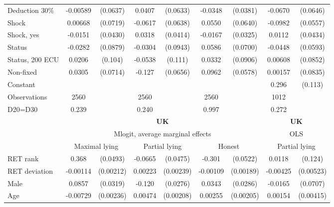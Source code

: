 \begin{tabular}{l|cccccc|cc}
Deduction 30\%& -0.00589         & (0.0637)&   0.0407         & (0.0633)&  -0.0348         & (0.0381)&  -0.0670         & (0.0646)\\
Shock         &  0.00668         & (0.0719)&  -0.0617         & (0.0638)&   0.0550         & (0.0640)&  -0.0982\sym{*}  & (0.0557)\\
Shock, yes    &  -0.0151         & (0.0430)&   0.0318         & (0.0414)&  -0.0167         & (0.0325)&   0.0112         & (0.0434)\\
Status        &  -0.0282         & (0.0879)&  -0.0304         & (0.0943)&   0.0586         & (0.0700)&  -0.0448         & (0.0593)\\
Status, 200 ECU&   0.0206         &  (0.104)&  -0.0538         &  (0.111)&   0.0332         & (0.0906)&  0.00608         & (0.0852)\\
Non-fixed     &   0.0305         & (0.0714)&   -0.127\sym{*}  & (0.0656)&   0.0962\sym{*}  & (0.0578)&  0.00157         & (0.0835)\\
Constant        &                  &         &                  &         &                  &         &    0.296\sym{***}&  (0.113)\\
\hline
Observations    &     2560         &         &     2560         &         &     2560         &         &     1012         &         \\
D20=D30         &    0.239         &         &    0.240         &         &    0.997         &         &    0.272         &         \\
\hline\hline
&\multicolumn{6}{c|}{\bf UK}&\multicolumn{2}{c}{\bf UK}\\ &\multicolumn{6}{c|}{Mlogit, average marginal effects }&\multicolumn{2}{c}{OLS}\\
                &\multicolumn{2}{c}{Maximal lying}&\multicolumn{2}{c}{Partial lying}&\multicolumn{2}{c|}{Honest}  &\multicolumn{2}{c}{Partial lying}\\
\hline
RET rank        &    0.368\sym{***}& (0.0493)&  -0.0665         & (0.0475)&   -0.301\sym{***}& (0.0522)&   0.0118         &  (0.124)\\
RET deviation   & -0.00114         &(0.00212)&  0.00223         &(0.00239)& -0.00109         &(0.00189)& -0.00425         &(0.00523)\\
Male            &   0.0857\sym{***}& (0.0319)&   -0.120\sym{***}& (0.0276)&   0.0343         & (0.0286)&  -0.0165         & (0.0707)\\
Age             & -0.00729\sym{***}&(0.00236)&  0.00474\sym{**} &(0.00208)&  0.00255         &(0.00205)&  0.00154         &(0.00415)\\

\end{tabular}
